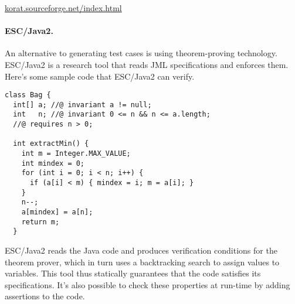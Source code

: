 \documentclass[11pt]{article}
\begin{document}
    \begin{center}
    \url{korat.sourceforge.net/index.html}
  \end{center}

\paragraph{ESC/Java2.}
An alternative to generating test cases is using theorem-proving
technology. ESC/Java2 is a research tool that reads JML specifications
and enforces them. Here's some sample code that ESC/Java2 can verify.
{\small \begin{lstlisting}
class Bag {
  int[] a; //@ invariant a != null;
  int   n; //@ invariant 0 <= n && n <= a.length;
  //@ requires n > 0;

  int extractMin() {
    int m = Integer.MAX_VALUE;
    int mindex = 0;
    for (int i = 0; i < n; i++) {
      if (a[i] < m) { mindex = i; m = a[i]; } 
    }
    n--;
    a[mindex] = a[n];
    return m;
  }
\end{lstlisting} }
ESC/Java2 reads the Java code and produces verification conditions for the theorem
prover, which in turn uses a backtracking search to assign values to variables.
This tool thus statically guarantees that the code satisfies its specifications.
It's also possible to check these properties at run-time by adding assertions to the code.
\end{document}
